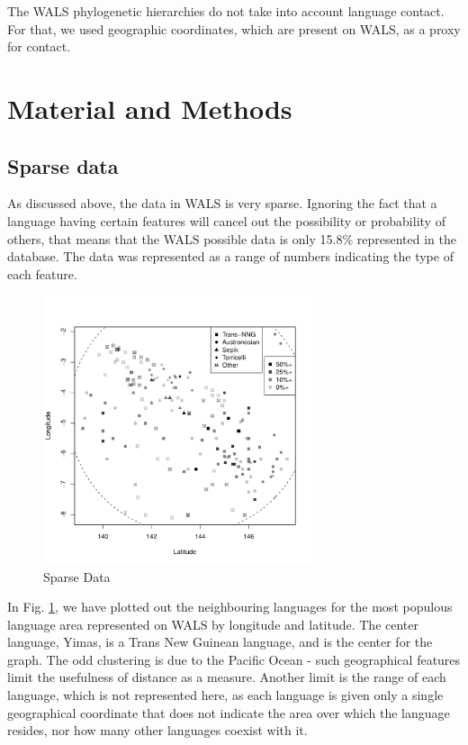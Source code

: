 \documentclass[11pt]{article}
\begin{document}
The WALS phylogenetic hierarchies do not take into account language contact. For that, we used geographic coordinates, which are present on WALS, as a proxy for contact. 



\section{Material and Methods}
\subsection{Sparse data}

As discussed above, the data in WALS is very sparse.
Ignoring the fact that a language having certain features will cancel out the possibility or probability of others, that means that the WALS possible data is only 15.8\% represented in the database. The data was represented as a range of numbers indicating the type of each feature.

\begin{figure}[h]
\includegraphics[width=3.1in]
{graph1.pdf} 
\caption{Sparse Data} 
\label{fig:sparse} 
\end{figure}

In Fig. \ref{fig:sparse}, we have plotted out the neighbouring languages for the most populous language area represented on WALS by longitude and latitude. The center language, Yimas, is a Trans New Guinean language, and is the center for the graph. The odd clustering is due to the Pacific Ocean - such geographical features limit the usefulness of distance as a measure. Another limit is the range of each language, which is not represented here, as each language is given only a single geographical coordinate that does not indicate the area over which the language resides, nor how many other languages coexist with it.
\end{document}
